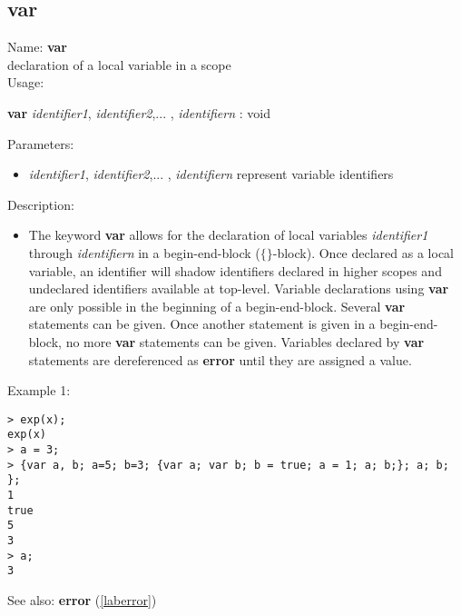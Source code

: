 \subsection{var}
\label{labvar}
\noindent Name: \textbf{var}\\
declaration of a local variable in a scope\\

\noindent Usage: 
\begin{center}
\textbf{var} \emph{identifier1}, \emph{identifier2},... , \emph{identifiern} : \textsf{void}\\
\end{center}
Parameters: 
\begin{itemize}
\item \emph{identifier1}, \emph{identifier2},... , \emph{identifiern} represent variable identifiers
\end{itemize}
\noindent Description: \begin{itemize}

\item The keyword \textbf{var} allows for the declaration of local variables
   \emph{identifier1} through \emph{identifiern} in a begin-end-block ($\lbrace \rbrace$-block).
   Once declared as a local variable, an identifier will shadow
   identifiers declared in higher scopes and undeclared identifiers
   available at top-level.
   Variable declarations using \textbf{var} are only possible in the
   beginning of a begin-end-block. Several \textbf{var} statements can be
   given. Once another statement is given in a begin-end-block, no more
   \textbf{var} statements can be given.
   Variables declared by \textbf{var} statements are dereferenced as \textbf{error}
   until they are assigned a value. 
\end{itemize}
\noindent Example 1: 
\begin{center}\begin{minipage}{15cm}\begin{Verbatim}[frame=single]
> exp(x); 
exp(x)
> a = 3; 
> {var a, b; a=5; b=3; {var a; var b; b = true; a = 1; a; b;}; a; b; }; 
1
true
5
3
> a;
3
\end{Verbatim}
\end{minipage}\end{center}
See also: \textbf{error} (\ref{laberror})

